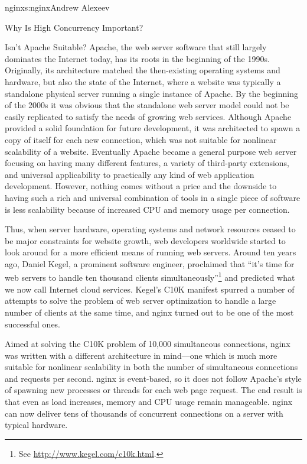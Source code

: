 \begin{aosachapter}{nginx}{s:nginx}{Andrew Alexeev}
\begin{aosasect1}{Why Is High Concurrency Important?}
\begin{aosasect2}{Isn't Apache Suitable?}
Apache, the web server software that still largely dominates the
Internet today, has its roots in the beginning of the
1990s. Originally, its architecture matched the then-existing
operating systems and hardware, but also the state of the 
Internet, where a website was typically a standalone physical server
running a single instance of Apache. By the beginning of the 2000s it
was obvious that the standalone web server model could not be easily
replicated to satisfy the needs of growing web services. Although
Apache provided a solid foundation for future development, it was
architected to spawn a copy of itself for each new connection, which
was not suitable for nonlinear scalability of a website. Eventually
Apache became a general purpose web server focusing on having many
different features, a variety of third-party extensions, and universal
applicability to practically any kind of web application
development. However, nothing comes without a price and the downside
to having such a rich and universal combination of tools in a single
piece of software is less scalability because of increased CPU and
memory usage per connection.

Thus, when server hardware, operating systems and network resources
ceased to be major constraints for website growth, web developers
worldwide started to look around for a more efficient means of running
web servers. Around ten years ago, Daniel Kegel, a prominent software
engineer, proclaimed that ``it's time for web servers to handle ten
thousand clients simultaneously''\footnote{See
\url{http://www.kegel.com/c10k.html}.} and predicted what we
now call Internet cloud services. Kegel's C10K manifest spurred a
number of attempts to solve the problem of web server optimization to
handle a large number of clients at the same time, and nginx turned
out to be one of the most successful ones.

Aimed at solving the C10K problem of 10,000 simultaneous connections,
nginx was written with a different architecture in mind---one which is
much more suitable for nonlinear scalability in both the number of
simultaneous connections and requests per second. nginx is
event-based, so it does not follow Apache's style of spawning new
processes or threads for each web page request. The end result is that
even as load increases, memory and CPU usage remain manageable. nginx
can now deliver tens of thousands of concurrent connections on a
server with typical hardware.


\end{aosasect2}
\end{aosasect1}
\end{aosachapter}
